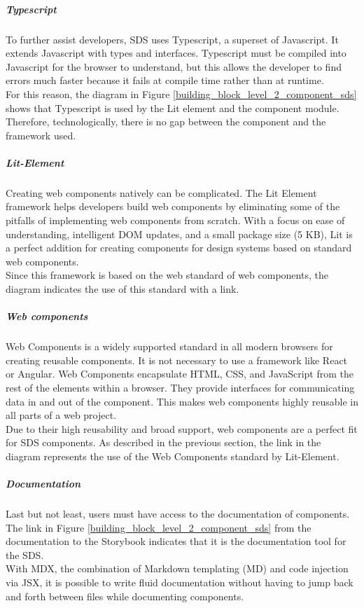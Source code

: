 \subparagraph{Typescript}
To further assist developers, \ac{SDS} uses Typescript, a superset of Javascript. It extends Javascript with types and interfaces. Typescript must be compiled into Javascript for the browser to understand, but this allows the developer to find errors much faster because it fails at compile time rather than at runtime. \citep{microsoft_typescript_nodate} \\
For this reason, the diagram in Figure \ref{building_block_level_2_component_sds} shows that Typescript is used by the Lit element and the component module. Therefore, technologically, there is no gap between the component and the framework used.

\subparagraph{Lit-Element}
Creating web components natively can be complicated. The Lit Element framework helps developers build web components by eliminating some of the pitfalls of implementing web components from scratch. With a focus on ease of understanding, intelligent \ac{DOM} updates, and a small package size (5 KB), Lit is a perfect addition for creating components for design systems based on standard web components. \citep{lit_nodate} \\
Since this framework is based on the web standard of web components, the diagram indicates the use of this standard with a link.

\subparagraph{Web components}
Web Components is a widely supported standard in all modern browsers for creating reusable components. It is not necessary to use a framework like React or Angular. Web Components encapsulate \ac{HTML}, \ac{CSS}, and JavaScript from the rest of the elements within a browser. They provide interfaces for communicating data in and out of the component. This makes web components highly reusable in all parts of a web project. \citep{mdn_web_component_nodate} \\
Due to their high reusability and broad support, web components are a perfect fit for \ac{SDS} components. As described in the previous section, the link in the diagram represents the use of the Web Components standard by Lit-Element.

\subparagraph{Documentation}
Last but not least, users must have access to the documentation of components. The link in Figure \ref{building_block_level_2_component_sds} from the documentation to the Storybook indicates that it is the documentation tool for the \ac{SDS}. \\
With MDX, the combination of Markdown templating (MD) and code injection via JSX, it is possible to write fluid documentation without having to jump back and forth between files while documenting components. \citep{otander_markdown_2017} \\

